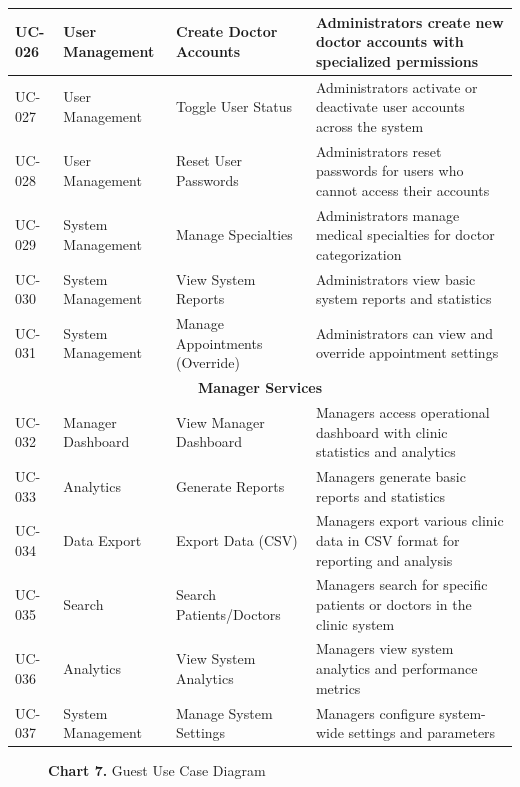 \documentclass[12pt,a4paper]{article}
\begin{document}
\begin{longtable}{|p{1cm}|p{3cm}|p{3cm}|p{7cm}|}
\hline
UC-026 & User Management & Create Doctor Accounts & Administrators create new doctor accounts with specialized permissions \\
\hline
UC-027 & User Management & Toggle User Status & Administrators activate or deactivate user accounts across the system \\
\hline
UC-028 & User Management & Reset User Passwords & Administrators reset passwords for users who cannot access their accounts \\
\hline
UC-029 & System Management & Manage Specialties & Administrators manage medical specialties for doctor categorization \\
\hline
UC-030 & System Management & View System Reports & Administrators view basic system reports and statistics \\
\hline
UC-031 & System Management & Manage Appointments (Override) & Administrators can view and override appointment settings \\
\hline
\multicolumn{4}{|c|}{\textbf{Manager Services}} \\
\hline
UC-032 & Manager Dashboard & View Manager Dashboard & Managers access operational dashboard with clinic statistics and analytics \\
\hline
UC-033 & Analytics & Generate Reports & Managers generate basic reports and statistics \\
\hline
UC-034 & Data Export & Export Data (CSV) & Managers export various clinic data in CSV format for reporting and analysis \\
\hline
UC-035 & Search & Search Patients/Doctors & Managers search for specific patients or doctors in the clinic system \\
\hline
UC-036 & Analytics & View System Analytics & Managers view system analytics and performance metrics \\
\hline
UC-037 & System Management & Manage System Settings & Managers configure system-wide settings and parameters \\
\hline

\end{longtable}
\begin{figure}[H]
    \centering
    
    \caption*{\textbf{Chart 7.} Guest Use Case Diagram}
\end{figure}
\end{document}
